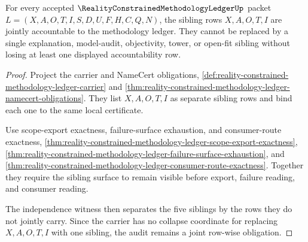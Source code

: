 \begin{theorem}
\label{thm:reality-constrained-methodology-ledger-sibling-audit-triad}
For every accepted $\RealityConstrainedMethodologyLedgerUp$ packet
$L=(X,A,O,T,I,S,D,U,F,H,C,Q,N)$, the sibling rows $X,A,O,T,I$ are jointly
accountable to the methodology ledger. They cannot be replaced by a single
explanation, model-audit, objectivity, tower, or open-fit sibling without
losing at least one displayed accountability row.
\end{theorem}
\begin{proof}
Project the carrier and NameCert obligations,
\autoref{def:reality-constrained-methodology-ledger-carrier} and
\autoref{thm:reality-constrained-methodology-ledger-namecert-obligations}. They
list $X,A,O,T,I$ as separate sibling rows and bind each one to the same local
certificate.

Use scope-export exactness, failure-surface exhaustion, and consumer-route
exactness,
\autoref{thm:reality-constrained-methodology-ledger-scope-export-exactness},
\autoref{thm:reality-constrained-methodology-ledger-failure-surface-exhaustion},
and
\autoref{thm:reality-constrained-methodology-ledger-consumer-route-exactness}.
Together they require the sibling surface to remain visible before export,
failure reading, and consumer reading.

The independence witness then separates the five siblings by the rows they do
not jointly carry. Since the carrier has no collapse coordinate for replacing
$X,A,O,T,I$ with one sibling, the audit remains a joint row-wise obligation.
\end{proof}

